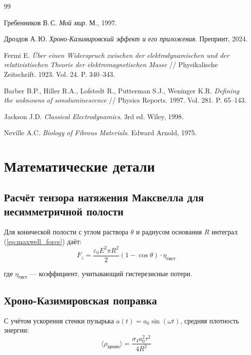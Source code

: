 \documentclass[12pt,a4paper]{article}
\begin{document}
\begin{thebibliography}{99}

Гребенников В.\,С. \textit{Мой мир}. М., 1997.

Дроздов А.\,Ю. \textit{Хроно-Казимировский эффект и его приложения}. Препринт, 2024.

Fermi E. \textit{Über einen Widerspruch zwischen der elektrodynamischen und der relativistischen Theorie der elektromagnetischen Masse} // Physikalische Zeitschrift. 1923. Vol. 24. P. 340--343.

Barber B.P., Hiller R.A., Lofstedt R., Putterman S.J., Weninger K.R. \textit{Defining the unknowns of sonoluminescence} // Physics Reports. 1997. Vol. 281. P. 65--143.

Jackson J.D. \textit{Classical Electrodynamics}. 3rd ed. Wiley, 1998.

Neville A.C. \textit{Biology of Fibrous Materials}. Edward Arnold, 1975.

\end{thebibliography}

\appendix

\section{Математические детали}

\subsection{Расчёт тензора натяжения Максвелла для несимметричной полости}

Для конической полости с углом раствора $\theta$ и радиусом основания $R$ интеграл (\ref{eq:maxwell_force}) даёт:
\begin{equation}
    F_z = \frac{\varepsilon_0 E^2 \pi R^2}{2} (1 - \cos\theta) \cdot \eta_{\text{гист}}
    \label{eq:cone_force}
\end{equation}

где $\eta_{\text{гист}}$ --- коэффициент, учитывающий гистерезисные потери.

\subsection{Хроно-Казимировская поправка}

С учётом ускорения стенки пузырька $a(t) = a_0 \sin(\omega t)$, средняя плотность энергии:
\begin{equation}
    \langle \rho_{\text{хроно}} \rangle = \frac{\sigma_4 a_0^2 \tau^2}{4 R^2}
    \label{eq:chrono_avg}
\end{equation}
\end{document}
